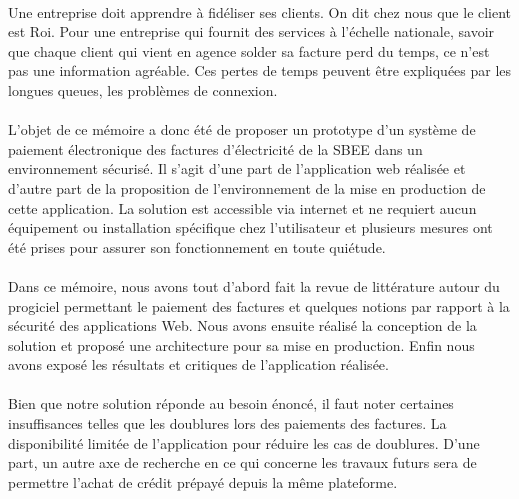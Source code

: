 \conclusion
    \paragraph{}
	Une entreprise doit apprendre \`a fid\'eliser ses clients. On dit chez nous que le client est Roi. Pour une entreprise qui fournit des services \`a l'\'echelle nationale, savoir que chaque client qui vient en agence solder sa facture perd du temps, ce n'est pas une information agr\'eable. Ces pertes de temps peuvent \^etre expliqu\'ees par les longues queues, les probl\`emes de connexion.

    \paragraph{}
	L'objet de ce mémoire a donc été de proposer un prototype d'un syst\`eme de paiement \'electronique des factures d'\'electricit\'e de la SBEE dans un environnement s\'ecuris\'e. Il s'agit d'une part de l'application web r\'ealis\'ee et d'autre part de la proposition de l'environnement de la mise en production de cette application. La solution est accessible via internet et ne requiert aucun équipement ou installation spécifique chez l'utilisateur et plusieurs mesures ont \'et\'e prises pour assurer son fonctionnement en toute qui\'etude.

    \paragraph{}
	Dans ce mémoire, nous avons tout d'abord fait la revue de littérature autour du progiciel permettant le paiement des factures et quelques notions par rapport \`a la s\'ecurit\'e des applications Web. Nous avons ensuite réalisé la conception de la solution et propos\'e une architecture pour sa mise en production. Enfin nous avons expos\'e les résultats et critiques de l'application r\'ealis\'ee.
    \paragraph{}
	Bien que notre solution réponde au besoin énoncé, il faut noter certaines insuffisances telles que les doublures lors des paiements des factures. La disponibilit\'e limit\'ee de l'application pour r\'eduire les cas de doublures. D'une part, un autre axe de recherche en ce qui concerne les travaux futurs sera de permettre l'achat de cr\'edit pr\'epay\'e depuis la m\^eme plateforme.


